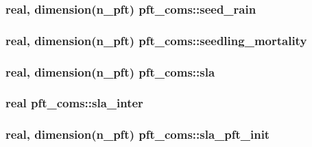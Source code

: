 \subsubsection[{seed\+\_\+rain}]{\setlength{\rightskip}{0pt plus 5cm}real, dimension(n\+\_\+pft) pft\+\_\+coms\+::seed\+\_\+rain}\label{namespacepft__coms_a9e5f0badf00a834a699115fc8974d9f2}
\hypertarget{namespacepft__coms_a0fe258b3674104f09d7226f87f39fc0b}{}
\subsubsection[{seedling\+\_\+mortality}]{\setlength{\rightskip}{0pt plus 5cm}real, dimension(n\+\_\+pft) pft\+\_\+coms\+::seedling\+\_\+mortality}\label{namespacepft__coms_a0fe258b3674104f09d7226f87f39fc0b}
\hypertarget{namespacepft__coms_ad1aabb01620d2b7320709e93cfe784f8}{}
\subsubsection[{sla}]{\setlength{\rightskip}{0pt plus 5cm}real, dimension(n\+\_\+pft) pft\+\_\+coms\+::sla}\label{namespacepft__coms_ad1aabb01620d2b7320709e93cfe784f8}
\hypertarget{namespacepft__coms_a7f2175fb500b1a4a0558108744ef6da8}{}
\subsubsection[{sla\+\_\+inter}]{\setlength{\rightskip}{0pt plus 5cm}real pft\+\_\+coms\+::sla\+\_\+inter}\label{namespacepft__coms_a7f2175fb500b1a4a0558108744ef6da8}
\hypertarget{namespacepft__coms_a535eacb23669b894d3f37596a40673e2}{}
\subsubsection[{sla\+\_\+pft\+\_\+init}]{\setlength{\rightskip}{0pt plus 5cm}real, dimension(n\+\_\+pft) pft\+\_\+coms\+::sla\+\_\+pft\+\_\+init}\label{namespacepft__coms_a535eacb23669b894d3f37596a40673e2}
\hypertarget{namespacepft__coms_a1ba9e47e49347dca3d82a5d2a694136d}{}

